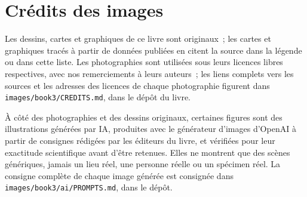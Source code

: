 \chapter*{Crédits des images}

Les dessins, cartes et graphiques de ce livre sont originaux~; les cartes
et graphiques tracés à partir de données publiées en citent la source dans
la légende ou dans cette liste. Les photographies sont utilisées sous leurs
licences libres respectives, avec nos remerciements à leurs auteurs~; les
liens complets vers les sources et les adresses des licences de chaque
photographie figurent dans \texttt{images/book3/CREDITS.md}, dans le dépôt
du livre.

\bigskip
À côté des photographies et des dessins originaux, certaines figures sont
des illustrations générées par IA, produites avec le générateur d'images
d'OpenAI à partir de consignes rédigées par les éditeurs du livre, et
vérifiées pour leur exactitude scientifique avant d'être retenues. Elles
ne montrent que des scènes génériques, jamais un lieu réel, une personne
réelle ou un spécimen réel. La consigne complète de chaque image générée
est consignée dans \texttt{images/book3/ai/PROMPTS.md}, dans le dépôt.

